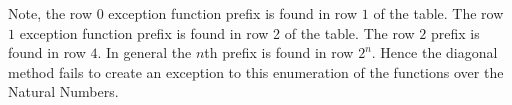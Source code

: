 \documentclass{article}
\begin{document}
    Note, the row \(0\) exception function prefix is found in row \(1\) of the table. The row \(1\) exception function prefix is found in row 2 of the table. The row \(2\) prefix is found in row \(4\). In general the \(n\)th prefix is found in row \(2^n\).  Hence the diagonal method fails to create an exception to this enumeration of the functions over the Natural Numbers.
    
    
 	
 	

	
\end{document}
